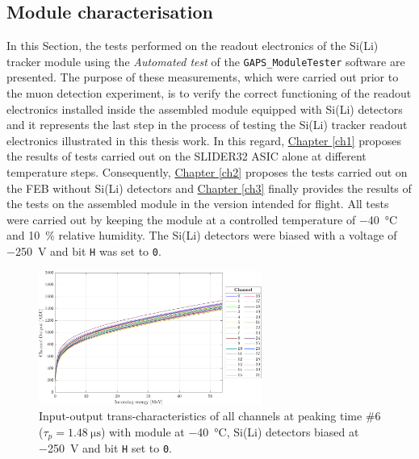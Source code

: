 \subsection{Module characterisation}
\label{secResultsMuonASIC}

In this Section, the tests performed on the readout electronics of the Si(Li) tracker module using the \textit{Automated test} of the \texttt{GAPS\_ModuleTester} software are presented. The purpose of these measurements, which were carried out prior to the muon detection experiment, is to verify the correct functioning of the readout electronics installed inside the assembled module equipped with Si(Li) detectors and it represents the last step in the process of testing the Si(Li) tracker readout electronics illustrated in this thesis work. In this regard, \hyperref[ch1]{Chapter \ref{ch1}} proposes the results of tests carried out on the SLIDER32 ASIC alone at different temperature steps. Consequently, \hyperref[ch2]{Chapter \ref{ch2}} proposes the tests carried out on the FEB without Si(Li) detectors and \hyperref[ch3]{Chapter \ref{ch3}} finally provides the results of the tests on the assembled module in the version intended for flight. All tests were carried out by keeping the module at a controlled temperature of \SI{-40}{\celsius} and \SI{10}{\percent} relative humidity. The Si(Li) detectors were biased with a voltage of \SI{-250}{\volt} and bit \texttt{H} was set to \texttt{0}.

\begin{figure}[h!]
    \centering
    \includegraphics[width=0.65\textwidth]{Images/chap3/results/FDT_MODULE_40C_250V.pdf}
    \caption{Input-output trans-characteristics of all channels at peaking time \#6 ($\tau_{p} = \SI{1.48}{\micro\second}$) with module at \SI{-40}{\celsius}, Si(Li) detectors biased at \SI{-250}{\volt} and bit \texttt{H} set to \texttt{0}.}
    \label{figFDTmodule40C250V}
\end{figure}


